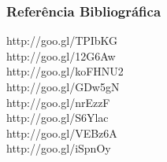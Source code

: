 \documentclass{beamer}
\begin{document}
\begin{frame}
\frametitle{Referência Bibliográfica}
{\scriptsize http://goo.gl/TPIbKG} \\
{\scriptsize http://goo.gl/12G6Aw} \\
{\scriptsize http://goo.gl/koFHNU2} \\
{\scriptsize http://goo.gl/GDw5gN} \\
{\scriptsize http://goo.gl/nrEzzF} \\
{\scriptsize http://goo.gl/S6Ylac} \\
{\scriptsize http://goo.gl/VEBz6A} \\
{\scriptsize http://goo.gl/iSpnOy} \\
\end{frame}
\end{document}
